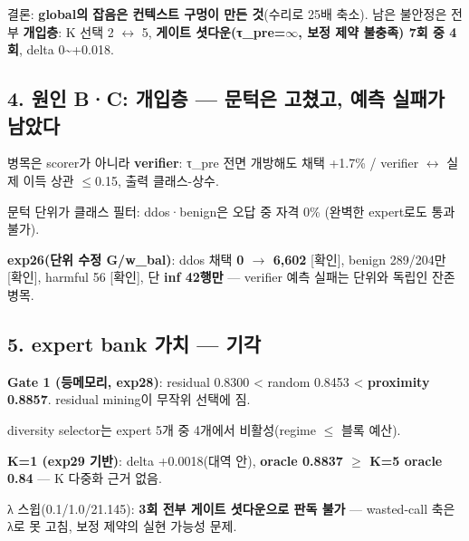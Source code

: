 \par\noindent \textbullet\enspace 결론: \textbf{global의 잡음은 컨텍스트 구멍이 만든 것}(수리로 25배 축소). 남은 불안정은 전부 \textbf{개입층}: K 선택 2 \ensuremath{\leftrightarrow} 5, \textbf{게이트 셧다운(τ\_\allowbreak{}pre=\allowbreak{}\ensuremath{\infty}, 보정 제약 불충족) 7회 중 4회}, delta 0\textasciitilde{}+\allowbreak{}0.018.


\subsection{4. 원인 B·C: 개입층 — 문턱은 고쳤고, 예측 실패가 남았다}
\par\noindent \textbullet\enspace 병목은 scorer가 아니라 \textbf{verifier}: τ\_\allowbreak{}pre 전면 개방해도 채택 +\allowbreak{}1.7\% /\allowbreak{} verifier \ensuremath{\leftrightarrow} 실제 이득 상관 \ensuremath{\leq}0.15, 출력 클래스-상수.


\par\noindent \textbullet\enspace 문턱 단위가 클래스 필터: ddos·benign은 오답 중 자격 0\% (완벽한 expert로도 통과 불가).


\par\noindent \textbullet\enspace \textbf{exp26(단위 수정 G/\allowbreak{}w\_\allowbreak{}bal)}: ddos 채택 \textbf{0 \ensuremath{\rightarrow} 6,602} [확인], benign 289/\allowbreak{}204만 [확인], harmful 56 [확인], 단 \textbf{inf 42행만} — verifier 예측 실패는 단위와 독립인 잔존 병목.


\subsection{5. expert bank 가치 — 기각}
\par\noindent \textbullet\enspace \textbf{Gate 1 (등메모리, exp28)}: residual 0.8300 < random 0.8453 < \textbf{proximity 0.8857}. residual mining이 무작위 선택에 짐.


\par\noindent \textbullet\enspace diversity selector는 expert 5개 중 4개에서 비활성(regime \ensuremath{\leq} 블록 예산).


\par\noindent \textbullet\enspace \textbf{K=\allowbreak{}1 (exp29 기반)}: delta +\allowbreak{}0.0018(대역 안), \textbf{oracle 0.8837 \ensuremath{\geq} K=\allowbreak{}5 oracle 0.84} — K 다중화 근거 없음.


\par\noindent \textbullet\enspace λ 스윕(0.1/\allowbreak{}1.0/\allowbreak{}21.145): \textbf{3회 전부 게이트 셧다운으로 판독 불가} — wasted-call 축은 λ로 못 고침, 보정 제약의 실현 가능성 문제.



